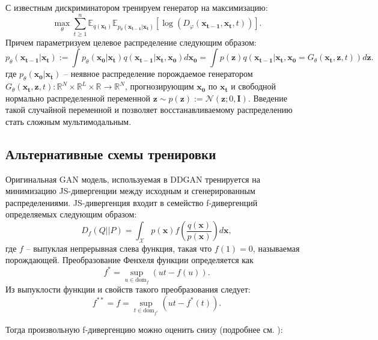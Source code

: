 \documentclass{article}
\begin{document}
С известным дискриминатором тренируем генератор на максимизацию:
 \begin{equation}
	\max\limits_\theta\sum\limits_{t\geqslant 1}^n \mathbb{E}_{q(\mathbf{x_t})}\mathbb{E}_{p_\theta(\mathbf{x_{t-1}}|\mathbf{x_t})}[\log{(D_\varphi(\mathbf{x_{t-1}}, \mathbf{x_t}, t))}].
\end{equation}
Причем параметризуем целевое распределение следующим образом:
 \begin{equation}
	p_\theta(\mathbf{x_{t-1}}|\mathbf{x_t}) := \int p_\theta(\mathbf{x_0}|\mathbf{x_t})q(\mathbf{x_{t-1}}|\mathbf{x_t}, \mathbf{x_0})d\mathbf{x_0} =\int p(\mathbf{z})q(\mathbf{x_{t-1}}|\mathbf{x_t}, \mathbf{x_0} = G_\theta(\mathbf{x_t}, \mathbf{z}, t))d\mathbf{z}.
\end{equation}
где $p_\theta(\mathbf{x_0}|\mathbf{x_t})$ -- неявное распределение порождаемое генератором $G_\theta(\mathbf{x_t}, \mathbf{z}, t):\mathbb{R}^N\times\mathbb{R}^L\times\mathbb{R}\to \mathbb{R}^N$, прогнозирующим $\mathbf{x_0}$ по $\mathbf{x_t}$ и свободной нормально распределенной переменной $\mathbf{z}\sim p(\mathbf{z}) := \mathcal{N}(\mathbf{z}; 0, \mathbf{I})$. Введение такой случайной переменной и позволяет восстанавливаемому распределению стать сложным мультимодальным.

\subsection{Альтернативные схемы тренировки}
Оригинальная GAN модель, используемая в DDGAN тренируется на минимизацию JS-дивергенции между исходным и сгенерированным распределениями. JS-дивергенция входит в семейство f-дивергенций \cite{1705001} определяемых следующим образом:
\begin{equation}
	D_f(Q||P) = \int_\mathcal{X} p(\mathbf{x}) f\left(\frac{q(\mathbf{x})}{p(\mathbf{x})}\right)d\mathbf{x},
\end{equation}
где $f$ -- выпуклая непрерывная слева функция, такая что $f(1) = 0$, называемая порождающей. Преобразование Фенхеля функции определяется как 
\begin{equation}
	f^* = \sup\limits_{u\in \text{dom}_f} (ut - f(u)).
\end{equation}
Из выпуклости функции и свойств такого преобразования следует:
\begin{equation}
	f^{**} = f = \sup\limits_{t\in \text{dom}_{f^*}} (ut - f^*(t)).
\end{equation}

Тогда произвольную f-дивергенцию можно оценить снизу (подробнее см. \cite{Nguyen_2010}):
\end{document}
